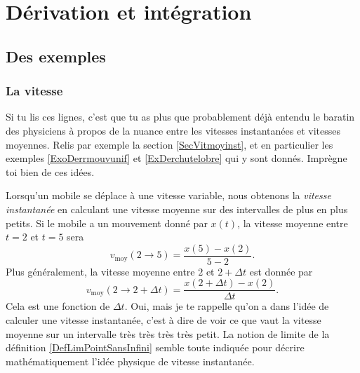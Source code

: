 \documentclass[a4paper,12pt]{book}
\theoremstyle{mes_exemples}	\newtheorem{exemple}[numtho]{Exemple}
\theoremstyle{mes_tho}
\begin{document}
\chapter{Dérivation et intégration}


					\section{Des exemples}

					\subsection{La vitesse}

Si tu lis ces lignes, c'est que tu as plus que probablement déjà entendu le baratin des physiciens à propos de la nuance entre les vitesses instantanées et vitesses moyennes. Relis par exemple la section \ref{SecVitmoyinst}, et en particulier les exemples \ref{ExoDerrmouvunif} et \ref{ExDerchutelobre} qui y sont donnés. Imprègne toi bien de ces idées.

Lorsqu'un mobile se déplace à une vitesse variable, nous obtenons la \emph{vitesse instantanée} en calculant une vitesse moyenne sur des intervalles de plus en plus petits. Si le mobile a un mouvement donné par $x(t)$, la vitesse moyenne entre $t=2$ et $t=5$ sera
\[ 
  v_{\text{moy}}(2\to 5)=\frac{ x(5)-x(2) }{ 5-2 }.
\]
Plus généralement, la vitesse moyenne entre $2$ et $2+\Delta t$ est donnée par
\[ 
  v_{\text{moy}}(2\to 2+\Delta t)=\frac{ x(2+\Delta t)-x(2) }{ \Delta t }.
\]
Cela est une fonction de $\Delta t$. Oui, mais je te rappelle qu'on a dans l'idée de calculer une vitesse instantanée, c'est à dire de voir ce que vaut la vitesse moyenne sur un intervalle très {\small très} {\footnotesize très} {\scriptsize très} {\tiny petit}. La notion de limite de la définition \ref{DefLimPointSansInfini} semble toute indiquée pour décrire mathématiquement l'idée physique de vitesse instantanée.
\end{document}
